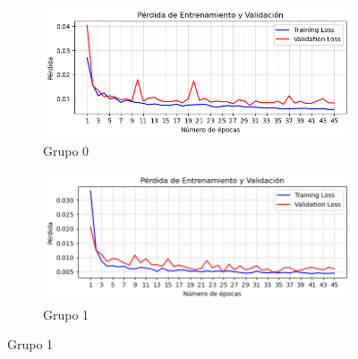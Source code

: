 \documentclass[12pt,a4paper]{report}
\begin{document}
\begin{figure}[H]
    \centering
    \begin{subfigure}{0.45\textwidth}
        \centering
        \includegraphics[width=\textwidth]{Images/tfm-4.6.0.png}
        \caption{Grupo 0}
    \end{subfigure}
    \begin{subfigure}{0.45\textwidth}
        \centering
        \includegraphics[width=\textwidth]{Images/tfm-4.6.1.png}
        \caption{Grupo 1}
    \end{subfigure}
    

\end{figure}
\end{document}
